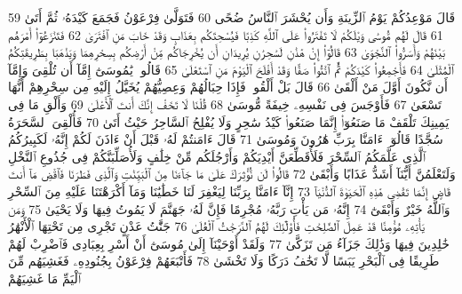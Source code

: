 {\tiny\colorbox{cl_aya}{59}} قَالَ مَوْعِدُكُمْ يَوْمُ ٱلزِّينَةِ وَأَن يُحْشَرَ ٱلنَّاسُ ضُحًى
{\tiny\colorbox{cl_aya}{60}} فَتَوَلَّىٰ فِرْعَوْنُ فَجَمَعَ كَيْدَهُۥ ثُمَّ أَتَىٰ
{\tiny\colorbox{cl_aya}{61}} قَالَ لَهُم مُّوسَىٰ وَيْلَكُمْ لَا تَفْتَرُوا۟ عَلَى ٱللَّهِ كَذِبًا فَيُسْحِتَكُم بِعَذَابٍ وَقَدْ خَابَ مَنِ ٱفْتَرَىٰ
{\tiny\colorbox{cl_aya}{62}} فَتَنَٰزَعُوٓا۟ أَمْرَهُم بَيْنَهُمْ وَأَسَرُّوا۟ ٱلنَّجْوَىٰ
{\tiny\colorbox{cl_aya}{63}} قَالُوٓا۟ إِنْ هَٰذَٰنِ لَسَٰحِرَٰنِ يُرِيدَانِ أَن يُخْرِجَاكُم مِّنْ أَرْضِكُم بِسِحْرِهِمَا وَيَذْهَبَا بِطَرِيقَتِكُمُ ٱلْمُثْلَىٰ
{\tiny\colorbox{cl_aya}{64}} فَأَجْمِعُوا۟ كَيْدَكُمْ ثُمَّ ٱئْتُوا۟ صَفًّا وَقَدْ أَفْلَحَ ٱلْيَوْمَ مَنِ ٱسْتَعْلَىٰ
{\tiny\colorbox{cl_aya}{65}} قَالُوا۟ يَٰمُوسَىٰٓ إِمَّآ أَن تُلْقِىَ وَإِمَّآ أَن نَّكُونَ أَوَّلَ مَنْ أَلْقَىٰ
{\tiny\colorbox{cl_aya}{66}} قَالَ بَلْ أَلْقُوا۟ فَإِذَا حِبَالُهُمْ وَعِصِيُّهُمْ يُخَيَّلُ إِلَيْهِ مِن سِحْرِهِمْ أَنَّهَا تَسْعَىٰ
{\tiny\colorbox{cl_aya}{67}} فَأَوْجَسَ فِى نَفْسِهِۦ خِيفَةً مُّوسَىٰ
{\tiny\colorbox{cl_aya}{68}} قُلْنَا لَا تَخَفْ إِنَّكَ أَنتَ ٱلْأَعْلَىٰ
{\tiny\colorbox{cl_aya}{69}} وَأَلْقِ مَا فِى يَمِينِكَ تَلْقَفْ مَا صَنَعُوٓا۟ إِنَّمَا صَنَعُوا۟ كَيْدُ سَٰحِرٍ وَلَا يُفْلِحُ ٱلسَّاحِرُ حَيْثُ أَتَىٰ
{\tiny\colorbox{cl_aya}{70}} فَأُلْقِىَ ٱلسَّحَرَةُ سُجَّدًا قَالُوٓا۟ ءَامَنَّا بِرَبِّ هَٰرُونَ وَمُوسَىٰ
{\tiny\colorbox{cl_aya}{71}} قَالَ ءَامَنتُمْ لَهُۥ قَبْلَ أَنْ ءَاذَنَ لَكُمْ إِنَّهُۥ لَكَبِيرُكُمُ ٱلَّذِى عَلَّمَكُمُ ٱلسِّحْرَ فَلَأُقَطِّعَنَّ أَيْدِيَكُمْ وَأَرْجُلَكُم مِّنْ خِلَٰفٍ وَلَأُصَلِّبَنَّكُمْ فِى جُذُوعِ ٱلنَّخْلِ وَلَتَعْلَمُنَّ أَيُّنَآ أَشَدُّ عَذَابًا وَأَبْقَىٰ
{\tiny\colorbox{cl_aya}{72}} قَالُوا۟ لَن نُّؤْثِرَكَ عَلَىٰ مَا جَآءَنَا مِنَ ٱلْبَيِّنَٰتِ وَٱلَّذِى فَطَرَنَا فَٱقْضِ مَآ أَنتَ قَاضٍ إِنَّمَا تَقْضِى هَٰذِهِ ٱلْحَيَوٰةَ ٱلدُّنْيَآ
{\tiny\colorbox{cl_aya}{73}} إِنَّآ ءَامَنَّا بِرَبِّنَا لِيَغْفِرَ لَنَا خَطَٰيَٰنَا وَمَآ أَكْرَهْتَنَا عَلَيْهِ مِنَ ٱلسِّحْرِ وَٱللَّهُ خَيْرٌ وَأَبْقَىٰٓ
{\tiny\colorbox{cl_aya}{74}} إِنَّهُۥ مَن يَأْتِ رَبَّهُۥ مُجْرِمًا فَإِنَّ لَهُۥ جَهَنَّمَ لَا يَمُوتُ فِيهَا وَلَا يَحْيَىٰ
{\tiny\colorbox{cl_aya}{75}} وَمَن يَأْتِهِۦ مُؤْمِنًا قَدْ عَمِلَ ٱلصَّٰلِحَٰتِ فَأُو۟لَٰٓئِكَ لَهُمُ ٱلدَّرَجَٰتُ ٱلْعُلَىٰ
{\tiny\colorbox{cl_aya}{76}} جَنَّٰتُ عَدْنٍ تَجْرِى مِن تَحْتِهَا ٱلْأَنْهَٰرُ خَٰلِدِينَ فِيهَا وَذَٰلِكَ جَزَآءُ مَن تَزَكَّىٰ
{\tiny\colorbox{cl_aya}{77}} وَلَقَدْ أَوْحَيْنَآ إِلَىٰ مُوسَىٰٓ أَنْ أَسْرِ بِعِبَادِى فَٱضْرِبْ لَهُمْ طَرِيقًا فِى ٱلْبَحْرِ يَبَسًا لَّا تَخَٰفُ دَرَكًا وَلَا تَخْشَىٰ
{\tiny\colorbox{cl_aya}{78}} فَأَتْبَعَهُمْ فِرْعَوْنُ بِجُنُودِهِۦ فَغَشِيَهُم مِّنَ ٱلْيَمِّ مَا غَشِيَهُمْ
